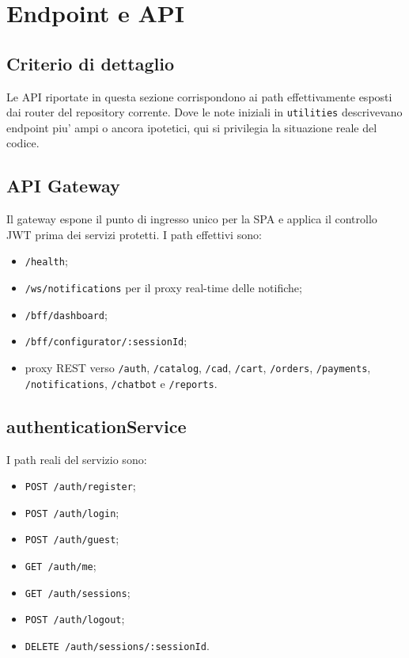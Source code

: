 \chapter{Endpoint e API}

\section{Criterio di dettaglio}

Le API riportate in questa sezione corrispondono ai path effettivamente esposti dai router del repository corrente. Dove le note iniziali in \texttt{utilities} descrivevano endpoint piu' ampi o ancora ipotetici, qui si privilegia la situazione reale del codice.

\section{API Gateway}

Il gateway espone il punto di ingresso unico per la SPA e applica il controllo JWT prima dei servizi protetti. I path effettivi sono:

\begin{itemize}
\item \texttt{/health};
\item \texttt{/ws/notifications} per il proxy real-time delle notifiche;
\item \texttt{/bff/dashboard};
\item \texttt{/bff/configurator/:sessionId};
\item proxy REST verso \texttt{/auth}, \texttt{/catalog}, \texttt{/cad}, \texttt{/cart}, \texttt{/orders}, \texttt{/payments}, \texttt{/notifications}, \texttt{/chatbot} e \texttt{/reports}.
\end{itemize}

\section{authenticationService}

I path reali del servizio sono:

\begin{itemize}
\item \texttt{POST /auth/register};
\item \texttt{POST /auth/login};
\item \texttt{POST /auth/guest};
\item \texttt{GET /auth/me};
\item \texttt{GET /auth/sessions};
\item \texttt{POST /auth/logout};
\item \texttt{DELETE /auth/sessions/:sessionId}.
\end{itemize}

